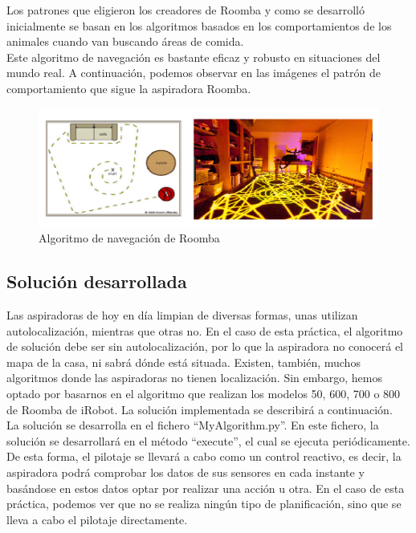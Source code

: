 Los patrones que eligieron los creadores de Roomba y como se desarrolló inicialmente se basan en los algoritmos basados en los comportamientos de los animales cuando van buscando áreas de comida.\\

Este algoritmo de navegación es bastante eficaz y robusto en situaciones del mundo real. A continuación, podemos observar en las imágenes el patrón de comportamiento que sigue la aspiradora Roomba.\\

\begin{figure}[H]
  \begin{center}
    \includegraphics[width=1\textwidth]{figures/Vacuum/Algoritmo_roomba.png}
		\caption{Algoritmo de navegación de Roomba}
		\label{fig.Algoritmo_roomba}
		\end{center}
\end{figure}

\subsection{Solución desarrollada}
Las aspiradoras de hoy en día limpian de diversas formas, unas utilizan autolocalización, mientras que otras no. En el caso de esta práctica, el algoritmo de solución debe ser sin autolocalización, por lo que la aspiradora no conocerá el mapa de la casa, ni sabrá dónde está situada. Existen, también, muchos algoritmos donde las aspiradoras no tienen localización. Sin embargo, hemos optado por basarnos en el algoritmo que realizan los modelos 50, 600, 700 o 800 de Roomba de iRobot. La solución implementada se describirá a continuación. \\

La solución se desarrolla en el fichero ``MyAlgorithm.py''. En este fichero, la solución se desarrollará en el método ``execute'', el cual se ejecuta periódicamente. De esta forma, el pilotaje se llevará a cabo como un control reactivo, es decir, la aspiradora podrá comprobar los datos de sus sensores en cada instante y basándose en estos datos optar por realizar una acción u otra. En el caso de esta práctica, podemos ver que no se realiza ningún tipo de planificación, sino que se lleva a cabo el pilotaje directamente.\\

